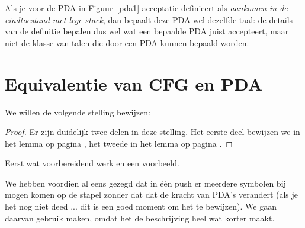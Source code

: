 Als je voor de PDA in Figuur~\ref{pda1} acceptatie definieert als {\em
aankomen in de eindtoestand met lege stack}, dan bepaalt deze PDA wel
dezelfde taal: de details van de definitie bepalen dus wel wat een
bepaalde PDA juist accepteert, maar niet de klasse van talen die door een
PDA kunnen bepaald worden.


\section{Equivalentie van CFG en PDA}

We willen de volgende stelling bewijzen:

\begin{proof}
Er zijn duidelijk twee delen in deze stelling. Het eerste deel
bewijzen we in het lemma op pagina \pageref{equicfgpda1}, het tweede
in het lemma op pagina \pageref{equicfgpda2}. \end{proof} 

Eerst wat voorbereidend werk en een voorbeeld.


We hebben voordien al eens gezegd dat in \'{e}\'{e}n push er meerdere
symbolen bij mogen komen op de stapel zonder dat dat de kracht van
PDA's verandert (als je het nog niet deed ... dit is een goed moment om
het te bewijzen). We gaan daarvan gebruik maken, omdat het de
beschrijving heel wat korter maakt.

